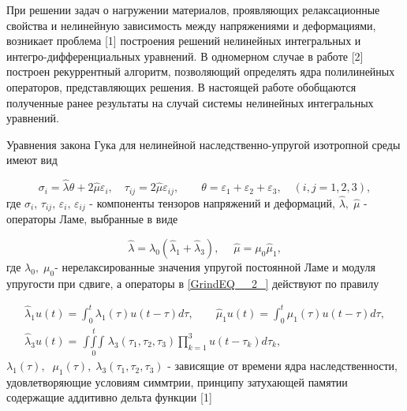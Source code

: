 \vzmscaption



При решении задач о нагружении материалов, проявляющих релаксационные свойства и нелинейную зависимость между напряжениями и деформациями, возникает проблема [1] построения решений  нелинейных интегральных и интегро-дифференциальных уравнений. В одномерном случае в работе [2] построен рекуррентный алгоритм, позволяющий определять ядра полилинейных операторов, представляющих решения. В настоящей работе обобщаются полученные ранее результаты на случай системы нелинейных интегральных уравнений.

Уравнения закона Гука для нелинейной наследственно-упругой изотропной среды имеют вид

\begin{equation} \label{GrindEQ__1_} \sigma _{i} =\hat{\lambda }\theta +2\hat{\mu }\varepsilon _{i} ,\quad \tau _{ij} =2\hat{\mu }\varepsilon _{ij} ,\quad \quad \theta =\varepsilon _{1} +\varepsilon _{2} +\varepsilon _{3} ,\quad (i,j=1,2,3), \end{equation}
где $\sigma _{i} ,\, \tau _{ij} ,\, \varepsilon _{i} ,\, \varepsilon _{ij} $ - компоненты тензоров напряжений и деформаций, $\hat{\lambda },\; \hat{\mu }$ - операторы Ламе, выбранные в виде

\begin{equation} \label{GrindEQ__2_} \hat{\lambda }=\lambda _{0} (\hat{\lambda }_{1} +\hat{\lambda }_{3} ),\quad \; \hat{\mu }=\mu _{0} \hat{\mu }_{1} , \end{equation}
где $\lambda _{0} ,\; \mu _{0} $- нерелаксированные значения упругой постоянной Ламе и модуля упругости при сдвиге, а операторы в \eqref{GrindEQ__2_} действуют по правилу

\begin{equation} \label{GrindEQ__3_} \begin{array}{l} {\hat{\lambda }_{1} u(t)=\int _{0}^{t}\lambda _{1}  (\tau )u(t-\tau )d\tau ,\quad \quad \hat{\mu }_{1} u(t)=\int _{0}^{t}\mu _{1}  (\tau )u(t-\tau )d\tau ,} \\ {\hat{\lambda }_{3} u(t)=\mathop{\int \int \int    }\limits_{0}^{t} \lambda _{3} (\tau _{1} ,\tau _{2} ,\tau _{3} )\prod _{k=1}^{3}u(t-\tau _{k} )d\tau _{k}  ,} \end{array} \end{equation}
$\lambda _{1} (\tau ),\; \; \mu _{1} (\tau ),\; \lambda _{3} (\tau _{1} ,\tau _{2} ,\tau _{3} )$ - зависящие от времени ядра наследственности, удовлетворяющие условиям симмтрии, принципу затухающей памятии содержащие аддитивно дельта функции [1]

